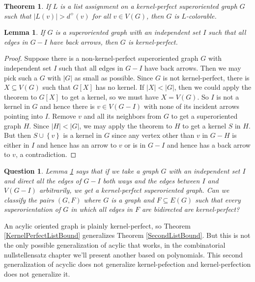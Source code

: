 \documentclass[openany]{tufte-book} %
\theoremstyle{plain}
\newtheorem{lemma}{Lemma}
\newtheorem{question}{Question}
\newtheorem{theorem}{Theorem}
\newcommand{\set}[1]{\left\{ #1 \right\}}
\newcommand{\card}[1]{\left|#1\right|}
\begin{document}
\begin{theorem}\label{KernelPerfectSuperListBound}
If $L$ is a list assignment on a kernel-perfect superoriented graph $G$ such that $\card{L(v)} > d^+(v)$ for all $v \in V(G)$, then $G$ is $L$-colorable.
\end{theorem}

\begin{lemma}\label{KostochkaYanceyKernelLemma}
If $G$ is a superoriented graph with an independent set $I$ such that all edges in $G-I$ have back arrows, then $G$ is kernel-perfect.
\end{lemma}
\begin{proof}
Suppose there is a non-kernel-perfect superoriented graph $G$ with independent set $I$ such that all edges in $G-I$ have back arrows.  Then we may pick such a $G$ with $\card{G}$
as small as possible.  Since $G$ is not kernel-perfect, there is $X \subseteq V(G)$ such that $G[X]$ has no kernel.  If $\card{X} < \card{G}$, 
then we could apply the theorem to $G[X]$ to get a kernel, so we must have $X = V(G)$.  So $I$ is not a kernel in $G$ and hence there is $v \in V(G-I)$ 
with none of its incident arrows pointing into $I$.  Remove $v$ and all its neighbors from $G$ to get a superoriented graph $H$. Since $\card{H} < \card{G}$, we may apply the
theorem to $H$ to get a kernel $S$ in $H$.  But then $S \cup \set{v}$ is a kernel in $G$ since any vertex other than $v$ in $G-H$ is either in $I$ and hence 
has an arrow to $v$ or is in $G-I$ and hence has a back arrow to $v$, a contradiction.
\end{proof}

\begin{question}
Lemma \ref{KostochkaYanceyKernelLemma} says that if we take a graph $G$ with an independent set $I$ and direct all the edges of $G-I$ both ways and the edges 
between $I$ and $V(G-I)$ arbitrarily, we get a kernel-perfect superoriented graph.  Can we classify the pairs $(G, F)$ where $G$ is a graph and $F \subseteq E(G)$ such that
every superorientation of $G$ in which all edges in $F$ are bidirected are kernel-perfect? 
\end{question}

An acylic oriented graph is plainly kernel-perfect, so Theorem \ref{KernelPerfectListBound} generalizes Theorem \ref{SecondListBound}.  
But this is not the only possible generalization of acylic that works, in the combinatorial nullstellensatz chapter we'll present 
another based on polynomials.
This second generalization of acyclic does not generalize kernel-pefection and kernel-perfection does not generalize it.
\end{document}
